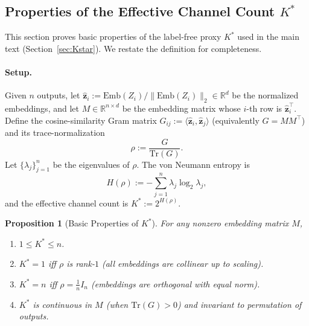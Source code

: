 \documentclass{article}
\theoremstyle{plain}
\newtheorem{proposition}[theorem]{Proposition}
\theoremstyle{definition}
\theoremstyle{remark}
\begin{document}
\subsection{Properties of the Effective Channel Count $K^*$}
\label{app:kstar}

This section proves basic properties of the label-free proxy $K^*$ used in the main text
(Section~\ref{sec:Kstar}). We restate the definition for completeness.

\paragraph{Setup.}
Given $n$ outputs, let $\hat{\mathbf{z}}_i := \mathrm{Emb}(Z_i)/\|\mathrm{Emb}(Z_i)\|_2 \in \mathbb{R}^d$ be the normalized embeddings, and let $M\in\mathbb{R}^{n\times d}$ be the embedding matrix whose $i$-th row is $\hat{\mathbf{z}}_i^\top$.
Define the cosine-similarity Gram matrix $G_{ij} := \langle \hat{\mathbf{z}}_i, \hat{\mathbf{z}}_j \rangle$ (equivalently $G=MM^\top$) and its trace-normalization
\begin{equation}
\rho := \frac{G}{\mathrm{Tr}(G)}.
\end{equation}
Let $\{\lambda_j\}_{j=1}^n$ be the eigenvalues of $\rho$.
The von Neumann entropy is
\begin{equation}
H(\rho):=-\sum_{j=1}^n \lambda_j \log_2 \lambda_j,
\end{equation}
and the effective channel count is $K^*:=2^{H(\rho)}$.

\begin{proposition}[Basic Properties of $K^*$]
\label{prop:kstar-properties}
For any nonzero embedding matrix $M$,
\begin{enumerate}[leftmargin=1.2em]
\item $1\le K^*\le n$.
\item $K^*=1$ iff $\rho$ is rank-$1$ (all embeddings are collinear up to scaling).
\item $K^*=n$ iff $\rho=\frac{1}{n}I_n$ (embeddings are orthogonal with equal norm).
\item $K^*$ is continuous in $M$ (when $\mathrm{Tr}(G)>0$) and invariant to permutation of outputs.
\end{enumerate}
\end{proposition}
\end{document}

